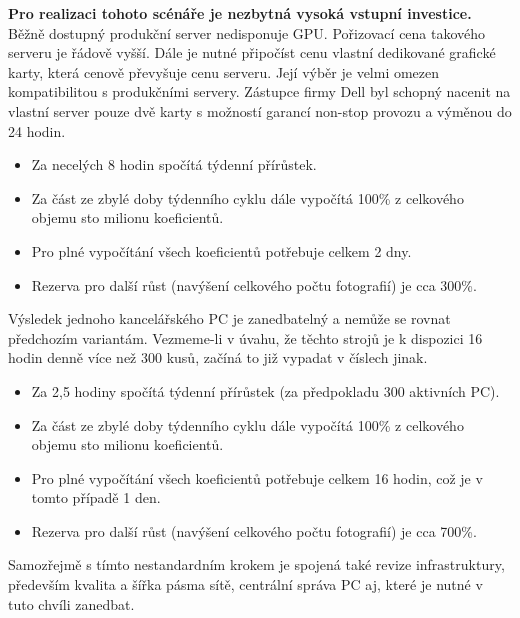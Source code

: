 \textbf{Pro realizaci tohoto scénáře je nezbytná vysoká vstupní investice.} Běžně dostupný produkční server nedisponuje GPU. Pořizovací cena takového serveru je řádově vyšší. Dále je nutné připočíst cenu vlastní dedikované grafické karty, která cenově převyšuje cenu serveru. Její výběr je velmi omezen kompatibilitou s produkčními servery. Zástupce firmy Dell byl schopný nacenit na vlastní server pouze dvě karty s možností garancí non-stop provozu a výměnou do 24 hodin.

\begin{itemize}
	\setlength{\parskip}{0pt}
	\setlength{\itemsep}{0pt}
	\item {Za necelých 8 hodin spočítá týdenní přírůstek.}
	\item {Za část ze zbylé doby týdenního cyklu dále vypočítá 100\% z celkového objemu sto milionu koeficientů.}
	\item {Pro plné vypočítání všech koeficientů potřebuje celkem 2 dny.}
	\item {Rezerva pro další růst (navýšení celkového počtu fotografií) je cca 300\%.}
\end{itemize}

Výsledek jednoho kancelářského PC je zanedbatelný a nemůže se rovnat předchozím variantám. Vezmeme-li v úvahu, že těchto strojů je k dispozici 16 hodin denně více než 300 kusů, začíná to již vypadat v číslech jinak.

\begin{itemize}
	\setlength{\parskip}{0pt}
	\setlength{\itemsep}{0pt}
	\item {Za 2,5 hodiny spočítá týdenní přírůstek (za předpokladu 300 aktivních PC).}
	\item {Za část ze zbylé doby týdenního cyklu dále vypočítá 100\% z celkového objemu sto milionu koeficientů.}
	\item {Pro plné vypočítání všech koeficientů potřebuje celkem 16 hodin, což je v tomto případě 1 den.}
	\item {Rezerva pro další růst (navýšení celkového počtu fotografií) je cca 700\%.}
\end{itemize}

Samozřejmě s tímto nestandardním krokem je spojená také revize infrastruktury, především kvalita a šířka pásma sítě, centrální správa PC aj, které je nutné v tuto chvíli zanedbat.

